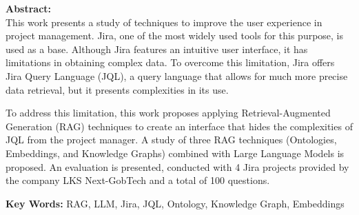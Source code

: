 \begin{itshape}
    \textbf{Abstract:} \\
    
    This work presents a study of techniques to improve the user experience in project management. Jira, one of the most widely used tools for this purpose, is used as a base. Although Jira features an intuitive user interface, it has limitations in obtaining complex data. To overcome this limitation, Jira offers Jira Query Language (JQL), a query language that allows for much more precise data retrieval, but it presents complexities in its use.

    To address this limitation, this work proposes applying Retrieval-Augmented Generation (RAG) techniques to create an interface that hides the complexities of JQL from the project manager. A study of three RAG techniques (Ontologies, Embeddings, and Knowledge Graphs) combined with Large Language Models is proposed. An evaluation is presented, conducted with 4 Jira projects provided by the company LKS Next-GobTech and a total of 100 questions.


    \textbf{Key Words:} RAG, LLM, Jira, JQL, Ontology, Knowledge Graph, Embeddings
\end{itshape}
\newpage